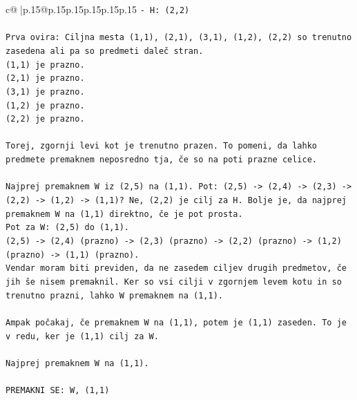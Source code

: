 \documentclass{article}
\begin{document}
{\begin{supertabular}{c@{$\;$}|p{.15\linewidth}@{}p{.15\linewidth}p{.15\linewidth}p{.15\linewidth}p{.15\linewidth}p{.15\linewidth}}
{{{\texttt{{-} H: (2,2)} \\
\\ 
\texttt{Prva ovira: Ciljna mesta (1,1), (2,1), (3,1), (1,2), (2,2) so trenutno zasedena ali pa so predmeti daleč stran.} \\
\texttt{(1,1) je prazno.} \\
\texttt{(2,1) je prazno.} \\
\texttt{(3,1) je prazno.} \\
\texttt{(1,2) je prazno.} \\
\texttt{(2,2) je prazno.} \\
\\ 
\texttt{Torej, zgornji levi kot je trenutno prazen. To pomeni, da lahko predmete premaknem neposredno tja, če so na poti prazne celice.} \\
\\ 
\texttt{Najprej premaknem W iz (2,5) na (1,1). Pot: (2,5) {-}> (2,4) {-}> (2,3) {-}> (2,2) {-}> (1,2) {-}> (1,1)? Ne, (2,2) je cilj za H. Bolje je, da najprej premaknem W na (1,1) direktno, če je pot prosta.} \\
\texttt{Pot za W: (2,5) do (1,1).} \\
\texttt{(2,5) {-}> (2,4) (prazno) {-}> (2,3) (prazno) {-}> (2,2) (prazno) {-}> (1,2) (prazno) {-}> (1,1) (prazno).} \\
\texttt{Vendar moram biti previden, da ne zasedem ciljev drugih predmetov, če jih še nisem premaknil. Ker so vsi cilji v zgornjem levem kotu in so trenutno prazni, lahko W premaknem na (1,1).} \\
\\ 
\texttt{Ampak počakaj, če premaknem W na (1,1), potem je (1,1) zaseden. To je v redu, ker je (1,1) cilj za W.} \\
\\ 
\texttt{Najprej premaknem W na (1,1).} \\
\\ 
\texttt{PREMAKNI SE: W, (1,1)} \\
            }
        }
    }
     \\ \\


\end{supertabular}}
\end{document}
